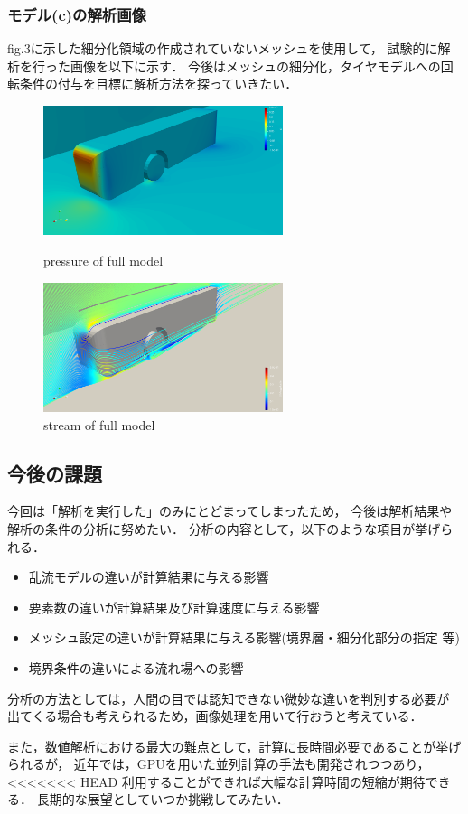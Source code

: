\documentclass[twocolumn,a4j]{jsarticle}
\begin{document}
\subsubsection{モデル(c)の解析画像}
fig.3に示した細分化領域の作成されていないメッシュを使用して，
試験的に解析を行った画像を以下に示す．
今後はメッシュの細分化，タイヤモデルへの回転条件の付与を目標に解析方法を探っていきたい．
\begin{figure}[htbp]
    \begin{center}
        \includegraphics[width=70mm]{screenshots/fullmodel_pressure.png}
        \caption{pressure of full model}
        \includegraphics[width=70mm]{screenshots/fullmodel_stream.png}
        \caption{stream of full model}
    \end{center}
\end{figure}
\subsection{今後の課題}
今回は「解析を実行した」のみにとどまってしまったため，
今後は解析結果や解析の条件の分析に努めたい．
分析の内容として，以下のような項目が挙げられる．
\begin{itemize}
    \item 乱流モデルの違いが計算結果に与える影響
    \item 要素数の違いが計算結果及び計算速度に与える影響
    \item メッシュ設定の違いが計算結果に与える影響(境界層・細分化部分の指定 等)
    \item 境界条件の違いによる流れ場への影響
\end{itemize}
\par
分析の方法としては，人間の目では認知できない微妙な違いを判別する必要が
出てくる場合も考えられるため，画像処理を用いて行おうと考えている．
\par
また，数値解析における最大の難点として，計算に長時間必要であることが挙げられるが，
近年では，GPUを用いた並列計算の手法も開発されつつあり，
<<<<<<< HEAD
利用することができれば大幅な計算時間の短縮が期待できる．
長期的な展望としていつか挑戦してみたい．
\end{document}
